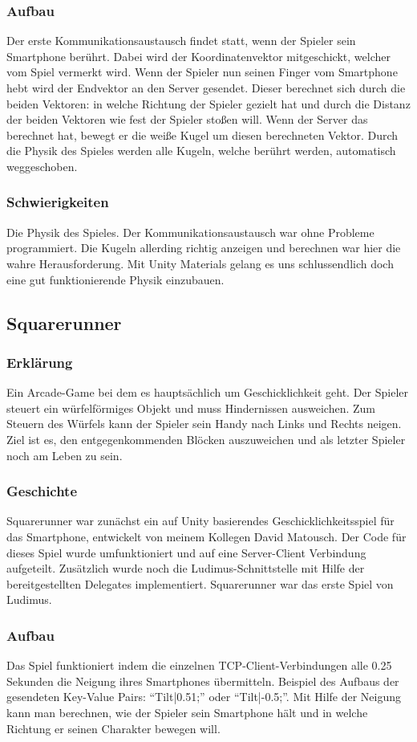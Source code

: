 \subsubsection{Aufbau}
Der erste Kommunikationsaustausch findet statt, wenn der Spieler sein Smartphone berührt. Dabei wird der Koordinatenvektor mitgeschickt, welcher vom Spiel vermerkt wird. Wenn der Spieler nun seinen Finger vom Smartphone hebt wird der Endvektor an den Server gesendet. Dieser berechnet sich durch die beiden Vektoren: in welche Richtung der Spieler gezielt hat und durch die Distanz der beiden Vektoren wie fest der Spieler stoßen will. Wenn der Server das berechnet hat, bewegt er die weiße Kugel um diesen berechneten Vektor. Durch die Physik des Spieles werden alle Kugeln, welche berührt werden, automatisch weggeschoben.
\subsubsection{Schwierigkeiten}
Die Physik des Spieles. Der Kommunikationsaustausch war ohne Probleme programmiert. Die Kugeln allerding richtig anzeigen und berechnen war hier die wahre Herausforderung. Mit Unity Materials gelang es uns schlussendlich doch eine gut funktionierende Physik einzubauen.
\subsection{Squarerunner}
\subsubsection{Erklärung}
Ein Arcade-Game bei dem es hauptsächlich um Geschicklichkeit geht. Der Spieler steuert ein würfelförmiges Objekt und muss Hindernissen ausweichen. Zum Steuern des Würfels kann der Spieler sein Handy nach Links und Rechts neigen. Ziel ist es, den entgegenkommenden Blöcken auszuweichen und als letzter Spieler noch am Leben zu sein.
\subsubsection{Geschichte}
Squarerunner war zunächst ein auf Unity basierendes Geschicklichkeitsspiel für das Smartphone, entwickelt von meinem Kollegen David Matousch. Der Code für dieses Spiel wurde umfunktioniert und auf eine Server-Client Verbindung aufgeteilt. Zusätzlich wurde noch die Ludimus-Schnittstelle mit Hilfe der bereitgestellten Delegates implementiert. Squarerunner war das erste Spiel von Ludimus.
\subsubsection{Aufbau}
Das Spiel funktioniert indem die einzelnen TCP-Client-Verbindungen alle 0.25 Sekunden die Neigung ihres Smartphones übermitteln. Beispiel des Aufbaus der gesendeten Key-Value Pairs:
“Tilt|0.51;” oder “Tilt|-0.5;”. Mit Hilfe der Neigung kann man berechnen, wie der Spieler sein Smartphone hält und in welche Richtung er seinen Charakter bewegen will.
